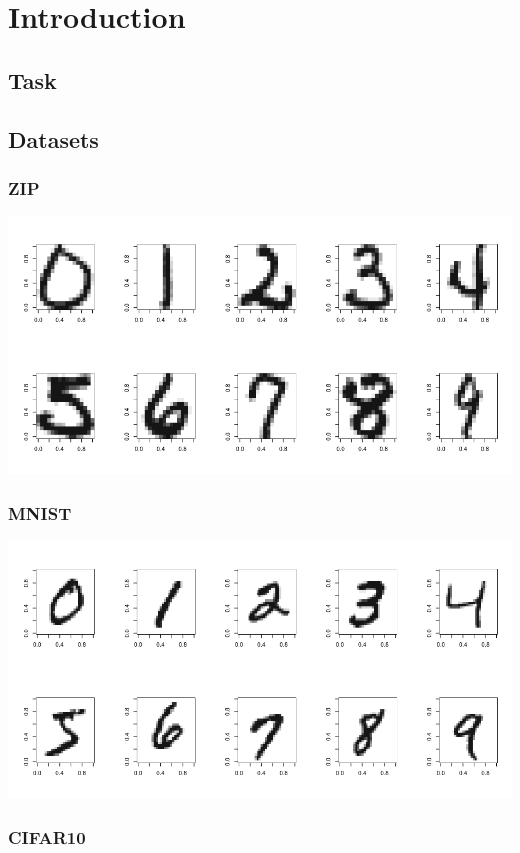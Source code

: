 
\section{Introduction}

\subsection{Task}

\subsection{Datasets}

\subsubsection{ZIP}

\includegraphics[width=\textwidth]{../plots/zip_dataset}

\subsubsection{MNIST}

\includegraphics[width=\textwidth]{../plots/mnist_dataset}

\subsubsection{CIFAR10}